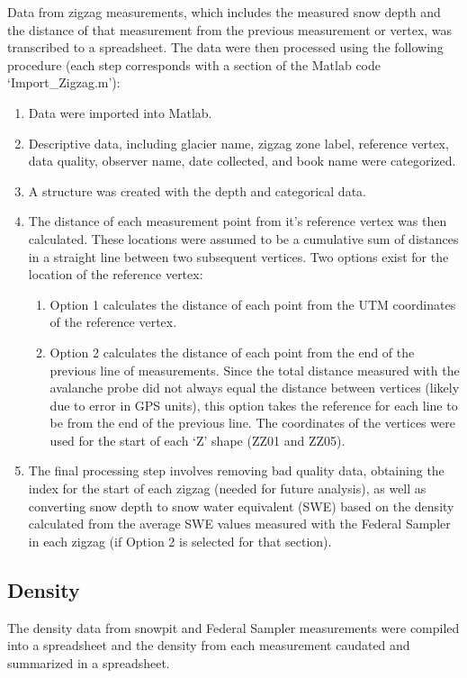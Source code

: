 \documentclass[12pt]{article}
\begin{document}
Data from zigzag measurements, which includes the measured snow depth and the distance of that measurement from the previous measurement or vertex, was transcribed to a spreadsheet. The data were then processed using the following procedure (each step corresponds with a section of the Matlab code `Import\_Zigzag.m'):
\begin{enumerate}
\item Data were imported into Matlab.
\item Descriptive data, including glacier name, zigzag zone label, reference vertex, data quality, observer name, date collected, and book name were categorized.
\item A structure was created with the depth and categorical data.
\item The distance of each measurement point from it's reference vertex was then calculated. These locations were assumed to be a cumulative sum of distances in a straight line between two subsequent vertices. Two options exist for the location of the reference vertex:
 	\begin{enumerate}
	\item Option 1 calculates the distance of each point from the UTM coordinates of the reference vertex.
	\item Option 2 calculates the distance of each point from the end of the previous line of measurements. Since the total distance measured with the avalanche probe did not always equal the distance between vertices (likely due to error in GPS units), this option takes the reference for each line to be from the end of the previous line. The coordinates of the vertices were used for the start of each `Z' shape (ZZ01 and ZZ05).
	\end{enumerate}
\item The final processing step involves removing bad quality data, obtaining the index for the start of each zigzag (needed for future analysis), as well as converting snow depth to snow water equivalent (SWE) based on the density calculated from the average SWE values measured with the Federal Sampler in each zigzag (if Option 2 is selected for that section).  
\end{enumerate}

\subsection{Density}

The density data from snowpit and Federal Sampler measurements were compiled into a spreadsheet and the density from each measurement caudated and summarized in a spreadsheet. 
\end{document}
